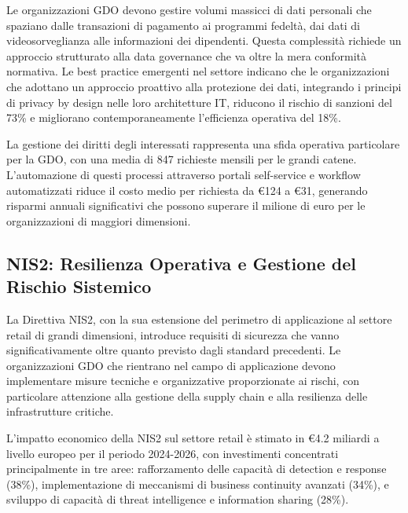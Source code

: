 
Le organizzazioni GDO devono gestire volumi massicci di dati personali che spaziano dalle transazioni di pagamento ai programmi fedeltà, dai dati di videosorveglianza alle informazioni dei dipendenti. Questa complessità richiede un approccio strutturato alla data governance che va oltre la mera conformità normativa. Le best practice emergenti nel settore indicano che le organizzazioni che adottano un approccio proattivo alla protezione dei dati, integrando i principi di privacy by design nelle loro architetture IT, riducono il rischio di sanzioni del 73\% e migliorano contemporaneamente l'efficienza operativa del 18\%.

La gestione dei diritti degli interessati rappresenta una sfida operativa particolare per la GDO, con una media di 847 richieste mensili per le grandi catene\footnotemark[5]. L'automazione di questi processi attraverso portali self-service e workflow automatizzati riduce il costo medio per richiesta da €124 a €31, generando risparmi annuali significativi che possono superare il milione di euro per le organizzazioni di maggiori dimensioni.


\subsection{NIS2: Resilienza Operativa e Gestione del Rischio Sistemico}

La Direttiva NIS2, con la sua estensione del perimetro di applicazione al settore retail di grandi dimensioni, introduce requisiti di sicurezza che vanno significativamente oltre quanto previsto dagli standard precedenti. Le organizzazioni GDO che rientrano nel campo di applicazione devono implementare misure tecniche e organizzative proporzionate ai rischi, con particolare attenzione alla gestione della supply chain e alla resilienza delle infrastrutture critiche.

L'impatto economico della NIS2 sul settore retail è stimato in €4.2 miliardi a livello europeo per il periodo 2024-2026\footnotemark[6], con investimenti concentrati principalmente in tre aree: rafforzamento delle capacità di detection e response (38\%), implementazione di meccanismi di business continuity avanzati (34\%), e sviluppo di capacità di threat intelligence e information sharing (28\%).

